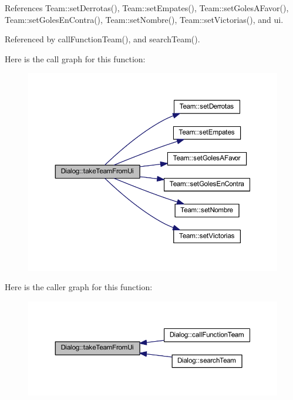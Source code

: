 References Team\+::set\+Derrotas(), Team\+::set\+Empates(), Team\+::set\+Goles\+A\+Favor(), Team\+::set\+Goles\+En\+Contra(), Team\+::set\+Nombre(), Team\+::set\+Victorias(), and ui.



Referenced by call\+Function\+Team(), and search\+Team().



Here is the call graph for this function\+:\nopagebreak
\begin{figure}[H]
\begin{center}
\leavevmode
\includegraphics[width=350pt]{df/da9/class_dialog_a03a550e5b4fa16614d27f8d4e2329e10_cgraph}
\end{center}
\end{figure}




Here is the caller graph for this function\+:\nopagebreak
\begin{figure}[H]
\begin{center}
\leavevmode
\includegraphics[width=350pt]{df/da9/class_dialog_a03a550e5b4fa16614d27f8d4e2329e10_icgraph}
\end{center}
\end{figure}




